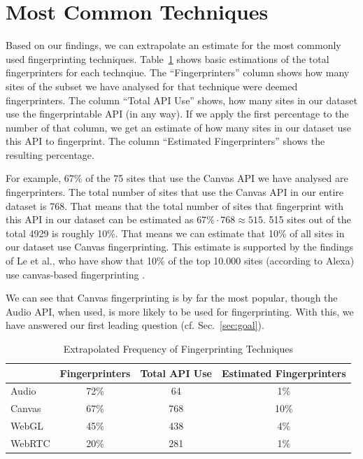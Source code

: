 \documentclass[
    fontsize=12pt,
    headings=small,
    parskip=half,
    bibliography=totoc,
    numbers=noenddot,
    open=any
    ]{scrreprt}
\begin{document}
\section{Most Common Techniques}
\label{sec:most_common_techniques}
Based on our findings, we can extrapolate an estimate for the most commonly used fingerprinting
techniques.
Table~\ref{table:technique_frequency} shows basic estimations of the total fingerprinters
for each technqiue. The ``Fingerprinters'' column shows how many sites of the subset
we have analysed for that technique were deemed fingerprinters. The column ``Total API Use''
shows, how many sites in our dataset use the fingerprintable API (in any way).
If we apply the first percentage to the number of that column, we get an estimate
of how many sites in our dataset use this API to fingerprint. The column ``Estimated Fingerprinters''
shows the resulting percentage.

For example, 67\% of the 75 sites that use the Canvas API we have analysed are fingerprinters.
The total number of sites that use the Canvas API in our entire dataset is 768.
That means that the total number of sites that fingerprint with this API in our dataset
can be estimated as $ 67\% \cdot 768 \approx 515  $. 515 sites out of the total 4929
is roughly 10\%. That means we can estimate that 10\% of all sites in our dataset use Canvas
fingerprinting.
This estimate is supported by the findings
of Le et al., who have show that 10\% of the top 10.000 sites (according to Alexa) use
canvas-based fingerprinting \cite{le_obfuscated_web_tracking}.

We can see that Canvas fingerprinting is by far the most popular, though the Audio API, when used,
is more likely to be used for fingerprinting.
With this, we have answered our first leading question (cf. Sec.~\ref{sec:goal}).

\begin{table}
\centering
\caption{Extrapolated Frequency of Fingerprinting Techniques}
\begin{tabular}{l c c c}
    \toprule
    & Fingerprinters & Total API Use & Estimated Fingerprinters \\
    \midrule
    Audio & 72\% & 64 & 1\% \\
    Canvas & 67\% & 768 & 10\% \\
    WebGL & 45\% & 438 & 4\% \\
    WebRTC & 20\% & 281 & 1\% \\
    \bottomrule
\end{tabular}
\label{table:technique_frequency}
\end{table}
\end{document}
